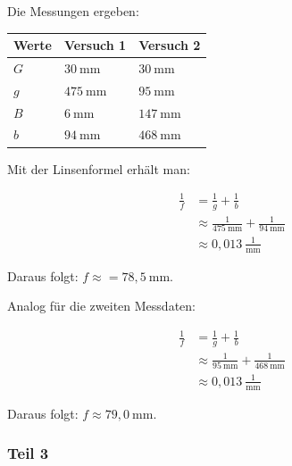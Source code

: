         Die Messungen ergeben:

        \begin{table}[h]
            \begin{center}
                \begin{tabular}{|l|l|l|}
                    \hline
                    Werte & Versuch 1 & Versuch 2\\
                    \hline
                    $G$ & $30\ \mathrm{mm}$ & $30\ \mathrm{mm}$ \\
                    $g$ & $475\ \mathrm{mm}$ & $95\ \mathrm{mm}$ \\
                    $B$ & $6\ \mathrm{mm}$ & $147\ \mathrm{mm}$ \\
                    $b$ & $94\ \mathrm{mm}$ & $468\ \mathrm{mm}$\\
                    \hline
                \end{tabular}
            \end{center}
        \end{table}

        Mit der Linsenformel erhält man:

        $$
        \begin{aligned}
            \frac{1}{f} &= \frac{1}{g} + \frac{1}{b}\\
            &\approx \frac{1}{475\ \mathrm{mm}} + \frac{1}{94\ \mathrm{mm}}\\
            &\approx 0,013\ \frac{1}{\mathrm{mm}}
        \end{aligned}
        $$

        Daraus folgt: $f \approx = 78,5\ \mathrm{mm}$.
        
        Analog für die zweiten Messdaten:

        $$
        \begin{aligned}
            \frac{1}{f} &= \frac{1}{g} + \frac{1}{b}\\
            &\approx \frac{1}{95\ \mathrm{mm}} + \frac{1}{468\ \mathrm{mm}}\\
            &\approx 0,013\ \frac{1}{\mathrm{mm}}
        \end{aligned}
        $$

        Daraus folgt: $f \approx 79,0\ \mathrm{mm}$.

    \subsubsection{Teil 3}
    

